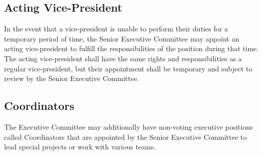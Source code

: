 \subsection{Acting Vice-President}
In the event that a vice-president is unable to perform their duties 
for a temporary period of time, the Senior Executive Committee may 
appoint an acting vice-president to fulfill the responsibilities of 
the position during that time. The acting vice-president shall have 
the same rights and responsibilities as a regular vice-president,
but their appointment shall be temporary and subject to review by 
the Senior Executive Committee.

\subsection{Coordinators}
The Executive Committee may additionally have non-voting executive
positions called Coordinators that are appointed by the Senior 
Executive Committee to lead special projects or work with various teams.
